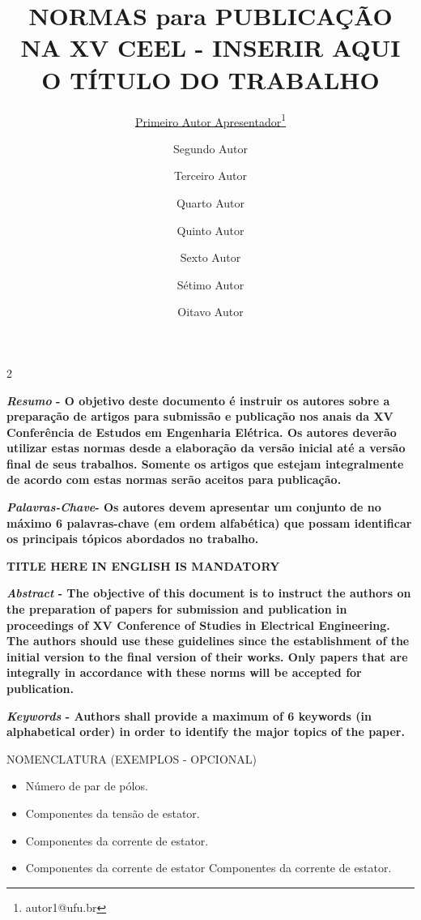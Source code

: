\documentclass{ceel}
\title{NORMAS para PUBLICAÇÃO NA XV CEEL - INSERIR AQUI O TÍTULO DO TRABALHO}
\author[1]{\underline{Primeiro Autor Apresentador}\thanks{autor1@ufu.br}}
\author[2]{Segundo Autor}
\author[3]{Terceiro Autor}
\author[4]{Quarto Autor}
\author[5]{Quinto Autor}
\author[6]{Sexto Autor}
\author[7]{Sétimo Autor}
\author[8]{Oitavo Autor}
\affil[1]{FEELT - Universidade Federal de Uberlândia}
\affil[2]{FEMEC - Universidade Federal de Uberlândia}
\affil[3]{FACIV - Universidade Federal de Uberlândia}
\begin{document}
\inserirtitulo

\begin{multicols}{2}

\textbf{\emph{Resumo} - O objetivo deste documento é instruir os autores sobre a preparação de artigos para submissão e publicação nos anais da XV Conferência de Estudos em Engenharia Elétrica. Os autores deverão utilizar estas normas desde a elaboração da versão inicial até a versão final de seus trabalhos. Somente os artigos que estejam integralmente de acordo com estas normas serão aceitos para publicação.}
\vspace*{10pt}

\textbf{\emph{Palavras-Chave}- Os autores devem apresentar um conjunto de no máximo 6 palavras-chave (em ordem alfabética) que possam identificar os principais tópicos abordados no trabalho.}


\begin{center}
\noindent\textbf{\large \uppercase{TITLE HERE IN ENGLISH IS MANDATORY}}
\end{center}

\textbf{\emph{Abstract} - The objective of this document is to instruct the authors on the preparation of papers for submission and publication in proceedings of XV Conference of Studies in Electrical Engineering. The authors should use these guidelines since the establishment of the initial version to the final version of their works. Only papers that are integrally in accordance with these norms will be accepted for publication. }
\vspace*{10pt}

\textbf{\emph{Keywords} - Authors shall provide a maximum of 6 keywords (in alphabetical order) in order to identify the major topics of the paper.}


\begin{center}
\uppercase{NOMENCLATURA (EXEMPLOS - OPCIONAL)}
\end{center}
\begin{itemize}
\setlength\itemsep{1mm}
\item [$P$] Número de par de pólos.
\item [$V_{qd}$] Componentes da tensão de estator.
\item [$I^{agr}_{qd}$] Componentes da corrente de estator.
\item [$I^{agr}_{qd}$] Componentes da corrente de estator Componentes da corrente de estator.
\end{itemize}


\end{multicols}
\end{document}

